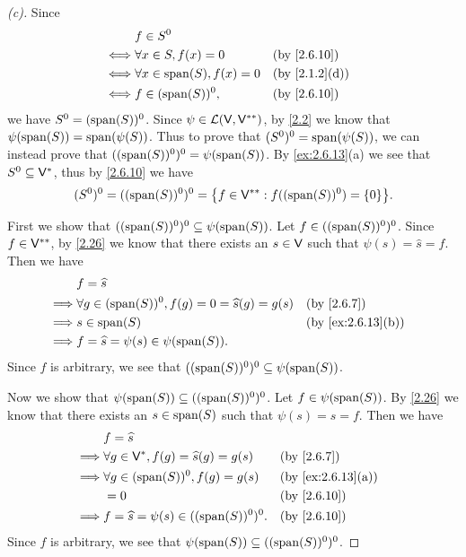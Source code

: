 \begin{proof}[(c)]
	Since
	\begin{align*}
		     & f \in S^0                                          \\
		\iff & \forall x \in S, f(x) = 0       &  & \by{2.6.10}   \\
		\iff & \forall x \in \spn{S}, f(x) = 0 &  & \by{2.1.2}[d] \\
		\iff & f \in (\spn{S})^0,              &  & \by{2.6.10}
	\end{align*}
	we have \(S^0 = (\spn{S})^0\).
	Since \(\psi \in \mathcal{L}(\mathsf{V}, \mathsf{V}^{**})\), by \cref{2.2} we know that \(\psi(\spn{S}) = \spn{\psi(S)}\).
	Thus to prove that \((S^0)^0 = \spn{\psi(S)}\), we can instead prove that \(((\spn{S})^0)^0 = \psi(\spn{S})\).
	By \cref{ex:2.6.13}(a) we see that \(S^0 \subseteq \mathsf{V}^*\), thus by \cref{2.6.10} we have
	\[
		(S^0)^0 = ((\spn{S})^0)^0 = \set{f \in \V^{**} : f((\spn{S})^0) = \set{0}}.
	\]

	First we show that \(((\spn{S})^0)^0 \subseteq \psi(\spn{S})\).
	Let \(f \in ((\spn{S})^0)^0\).
	Since \(f \in \mathsf{V}^{**}\), by \cref{2.26} we know that there exists an \(s \in \mathsf{V}\) such that \(\psi(s) = \widehat{s} = f\).
	Then we have
	\begin{align*}
		         & f = \widehat{s}                                                                    \\
		\implies & \forall g \in (\spn{S})^0, f(g) = 0 = \widehat{s}(g) = g(s) &  & \by{2.6.7}        \\
		\implies & s \in \spn{S}                                               &  & \by{ex:2.6.13}[b] \\
		\implies & f = \widehat{s} = \psi(s) \in \psi(\spn{S}).
	\end{align*}
	Since \(f\) is arbitrary, we see that \(((\spn{S})^0)^0 \subseteq \psi(\spn{S})\).

	Now we show that \(\psi(\spn{S}) \subseteq ((\spn{S})^0)^0\).
	Let \(f \in \psi(\spn{S})\).
	By \cref{2.26} we know that there exists an \(s \in \spn{S}\) such that \(\psi(s) = \widehat{s} = f\).
	Then we have
	\begin{align*}
		         & f = \widehat{s}                                                         \\
		\implies & \forall g \in \V^*, f(g) = \widehat{s}(g) = g(s) &  & \by{2.6.7}        \\
		\implies & \forall g \in (\spn{S})^0, f(g) = g(s)           &  & \by{ex:2.6.13}[a] \\
		         & = 0                                              &  & \by{2.6.10}       \\
		\implies & f = \widehat{s} = \psi(s) \in ((\spn{S})^0)^0.   &  & \by{2.6.10}
	\end{align*}
	Since \(f\) is arbitrary, we see that \(\psi(\spn{S}) \subseteq ((\spn{S})^0)^0\).
\end{proof}

